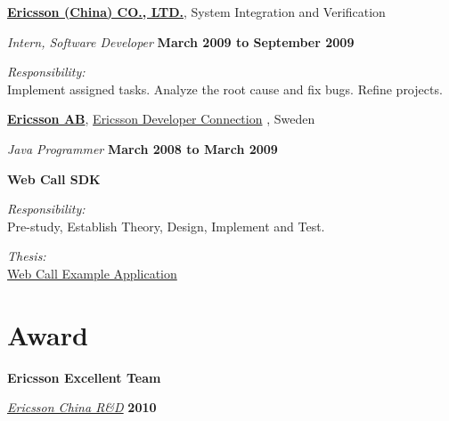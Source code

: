 %
\href{http://www.ericsson.com/cn}{\textbf{Ericsson (China) CO., LTD.}}, {System Integration and Verification}
\begin{outerlist}

\item[] \textit{Intern, Software Developer}%
        \hfill \textbf{March 2009 to September 2009}
\begin{outerlist}
\item \textit{Responsibility:}\\
Implement assigned tasks. Analyze the root cause and fix bugs.
Refine projects.
\end{outerlist}
\end{outerlist}
\blankline

%
\href{http://www.ericsson.com/}{\textbf{Ericsson AB}}, \href{http://www.ericsson.com/developer}{Ericsson Developer Connection} ,
Sweden
\begin{outerlist}

\item[] \textit{Java Programmer}%
        \hfill \textbf{March 2008 to March 2009}

\item[] {\textbf{Web Call SDK}}
\begin{outerlist}
\item \textit{Responsibility:}\\
Pre-study, Establish Theory, Design, Implement and Test. 
\item \textit{Thesis:}\\
\href{http://shanbohomepage.googlecode.com/hg/master_thesis/master_thesis.pdf}{Web Call Example Application}
\end{outerlist}
\end{outerlist}
\blankline



\section{Award}
\textbf{Ericsson Excellent Team}
\begin{outerlist}
\item[] \href{http://www.ericsson.com/}{\textit{Ericsson China R\&D}}
        \hfill \textbf{2010}
\end{outerlist}

